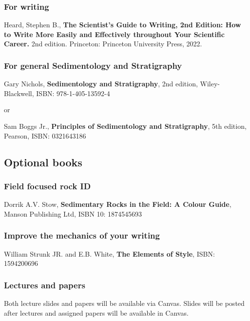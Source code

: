 \documentclass[11pt,]{article}
\begin{document}
\subsubsection{For writing}\label{for-writing}

Heard, Stephen B., \textbf{The Scientist's Guide to Writing, 2nd
Edition: How to Write More Easily and Effectively throughout Your
Scientific Career.} 2nd edition. Princeton: Princeton University Press,
2022.

\subsubsection{For general Sedimentology and
Stratigraphy}\label{for-general-sedimentology-and-stratigraphy}

Gary Nichols, \textbf{Sedimentology and Stratigraphy}, 2nd edition,
Wiley-Blackwell, ISBN: 978-1-405-13592-4

or

Sam Boggs Jr., \textbf{Principles of Sedimentology and Stratigraphy},
5th edition, Pearson, ISBN: 0321643186

\subsection{Optional books}\label{optional-books}

\subsubsection{Field focused rock ID}\label{field-focused-rock-id}

Dorrik A.V. Stow, \textbf{Sedimentary Rocks in the Field: A Colour
Guide}, Manson Publishing Ltd, ISBN 10: 1874545693

\subsubsection{Improve the mechanics of your
writing}\label{improve-the-mechanics-of-your-writing}

William Strunk JR. and E.B. White, \textbf{The Elements of Style}, ISBN:
1594200696

\subsubsection{Lectures and papers}\label{lectures-and-papers}

Both lecture slides and papers will be available via Canvas. Slides will
be posted after lectures and assigned papers will be available in
Canvas.
\end{document}
